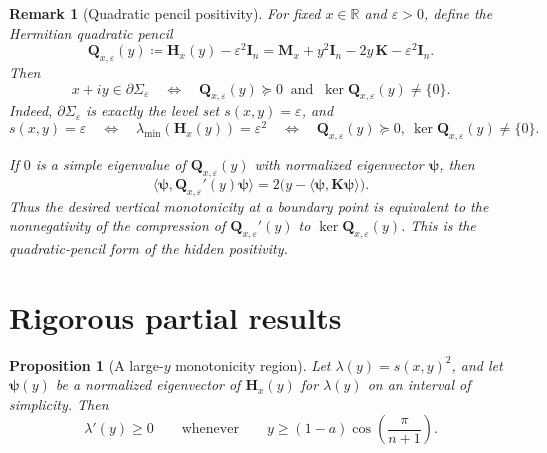 \documentclass[11pt]{article}
\newtheorem{proposition}[theorem]{Proposition}
\newtheorem{remark}[theorem]{Remark}
\begin{document}
\begin{remark}[Quadratic pencil positivity]\label{rem:quadratic-pencil}
For fixed \(x\in\mathbb R\) and \(\varepsilon>0\), define the Hermitian quadratic pencil
\[
\mathbf Q_{x,\varepsilon}(y)
\coloneqq
\mathbf H_x(y)-\varepsilon^2\mathbf I_n
=
\mathbf M_x+y^2\mathbf I_n-2y\,\mathbf K-\varepsilon^2\mathbf I_n.
\]
Then
\[
x+iy\in\partial\Sigma_\varepsilon
\quad\Longleftrightarrow\quad
\mathbf Q_{x,\varepsilon}(y)\succeq 0
\ \text{ and }\
\ker \mathbf Q_{x,\varepsilon}(y)\neq\{0\}.
\]
Indeed, \(\partial\Sigma_\varepsilon\) is exactly the level set \(s(x,y)=\varepsilon\), and
\[
s(x,y)=\varepsilon
\quad\Longleftrightarrow\quad
\lambda_{\min}(\mathbf H_x(y))=\varepsilon^2
\quad\Longleftrightarrow\quad
\mathbf Q_{x,\varepsilon}(y)\succeq 0,\ \ker\mathbf Q_{x,\varepsilon}(y)\neq\{0\}.
\]

If \(0\) is a simple eigenvalue of \(\mathbf Q_{x,\varepsilon}(y)\) with normalized eigenvector \(\boldsymbol{\psi}\), then
\[
\langle \boldsymbol{\psi},\mathbf Q_{x,\varepsilon}'(y)\boldsymbol{\psi}\rangle
=
2\bigl(y-\langle \boldsymbol{\psi},\mathbf K\boldsymbol{\psi}\rangle\bigr).
\]
Thus the desired vertical monotonicity at a boundary point is equivalent to the nonnegativity of the compression of \(\mathbf Q_{x,\varepsilon}'(y)\) to \(\ker \mathbf Q_{x,\varepsilon}(y)\). This is the quadratic-pencil form of the hidden positivity.
\end{remark}

\section{Rigorous partial results}

\begin{proposition}[A large-\(y\) monotonicity region]\label{prop:large-y}
Let \(\lambda(y)=s(x,y)^2\), and let \(\boldsymbol{\psi}(y)\) be a normalized eigenvector of \(\mathbf H_x(y)\) for \(\lambda(y)\) on an interval of simplicity. Then
\[
\lambda'(y)\ge 0
\qquad\text{whenever}\qquad
y\ge (1-a)\cos\!\left(\frac{\pi}{n+1}\right).
\]
\end{proposition}
\end{document}
